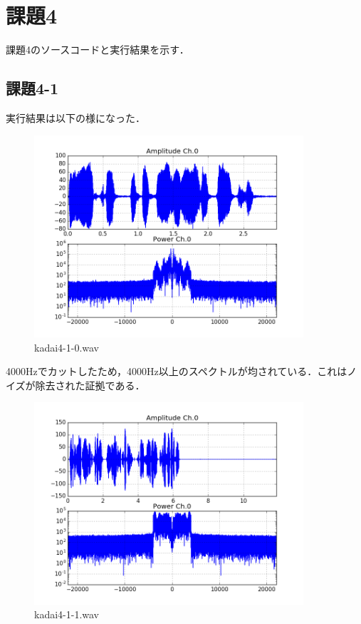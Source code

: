 \section{課題4}
課題4のソースコードと実行結果を示す．

\subsection{課題4-1}


実行結果は以下の様になった．

\begin{figure}[h]
  \begin{center}
    \includegraphics[width=10cm]{./img/kadai4-1-0.png}
    \caption{kadai4-1-0.wav}
  \end{center}
\end{figure}

4000Hzでカットしたため，4000Hz以上のスペクトルが均されている．これはノイズが除去された証拠である．

\begin{figure}[h]
  \begin{center}
    \includegraphics[width=10cm]{./img/kadai4-1-1.png}
    \caption{kadai4-1-1.wav}
  \end{center}
\end{figure}

